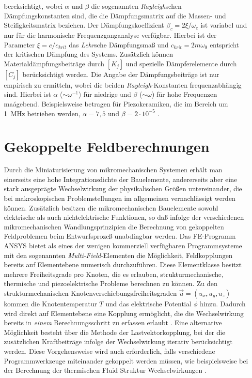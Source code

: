 bercksichtigt, wobei $\alpha$ und $\beta$ die sogenannten
{\sl Rayleigh}schen
Dämpfungskonstanten sind, die die Dämpfungsmatrix auf die Massen- und
Steifigkeitsmatrix beziehen. Der Dämpfungskoeffizient
$\beta_{c} = 2 \xi / \omega_{c}$ ist variabel und nur für die harmonische
Frequenzganganalyse verfügbar. Hierbei ist der Parameter
$\xi = c / c_{krit}$  das {\sl Lehr}sche Dämpfungsmaß und
$c_{krit} = 2 m \omega_{0} $ entspricht der kritischen Dämpfung des
Systems. Zusätzlich können Materialdämpfungsbeiträge durch $[K_{j}]$ und
spezielle Dämpferelemente durch $[C_{j}]$ berücksichtigt werden.
Die Angabe der Dämpfungsbeiträge ist nur empirisch zu ermitteln, wobei
die beiden {\sl Rayleigh}-Konstanten frequenzabhängig sind. Hierbei ist
$\alpha$ ($\sim \omega^{-1}$) für niedrige und $\beta$ ($\sim \omega$) für
hohe Frequenzen maágebend. Beispielsweise betragen für Piezokeramiken,
die im Bereich um 1~MHz betrieben werden, $\alpha = 7,5$ und
$\beta = 2 \cdot 10^{-5}$ \cite{Ler90}.



\section{Gekoppelte Feldberechnungen}
\label{feldberechnungen}

Durch die Miniaturisierung von mikromechanischen Systemen erhält man
einerseits eine hohe Integrationsdichte der Bauelemente, andererseits
aber eine stark ausgeprägte Wechselwirkung der physikalischen Größen
untereinander, die bei makroskopischen Problemstellungen im allgemeinen
vernachlässigt
werden können. Zusätzlich besitzen die mikromechanischen Bauelemente
sowohl elektrische als auch
nichtelektrische Funktionen, so daß infolge der verschiedenen
mikromechanischen Wandlungsprinzipien die Berechnung von gekoppelten
Feldproblemen beim Entwurfsprozeß unabdingbar werden. Das FE-Programm
{\sf ANSYS} bietet als eines der wenigen kommerziell verfügbaren
Programmsysteme
mit den sogenannten {\em Multi-Field}-Elementen die Möglichkeit,
Feldkopplungen bereits auf Element\-ebene numerisch durchzuführen.
Diese Elementklasse besitzt mehrere Freiheitsgrade pro Knoten, die es
erlauben, strukturmechanische, thermische und piezoelektrische Probleme
berechnen zu können. Zu den strukturmechanischen
Knotenverschiebungsfreiheitsgraden $\vec u = (u_{x}, u_{y}, u_{z})$
kommen die Knotentemperatur $T$ und das elektrische Potential $\phi$ hinzu.
Dadurch wird direkt auf Elementebene eine Kopplung ermöglicht, die die
Wechselwirkung bereits in {\em einem} Berechnungsschritt zu erfassen
erlaubt \cite{Ost89}. Eine alternative
Möglichkeit besteht über die Methode der Lastvektorkopplung, bei der die
zusätzlichen Kraftbeiträge infolge der Wechselwirkung iterativ berücksichtigt
werden. Diese Vorgehensweise wird auch erforderlich, falls verschiedene
Programmwerkzeuge miteinander gekoppelt werden müssen, wie beispielsweise
bei der Berechnung der thermischen Fluid-Struktur-Wechselwirkungen
\cite{Fab93b}.


